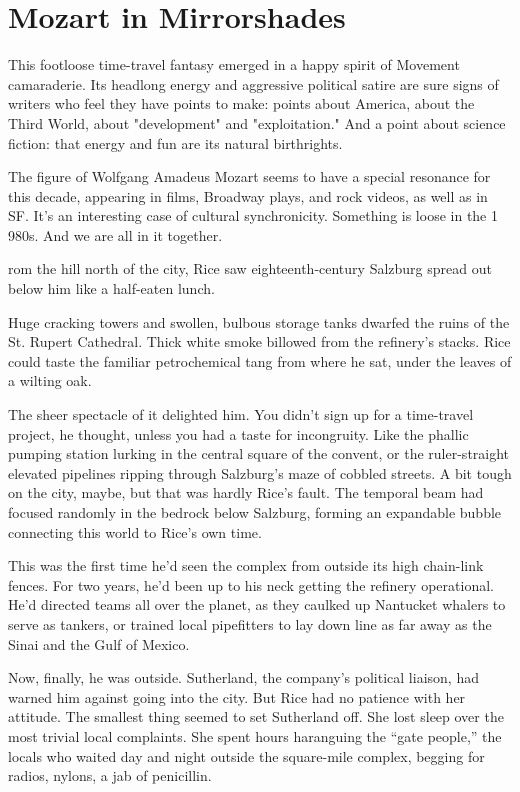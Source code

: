 \chapter{Mozart in Mirrorshades}

This footloose time-travel fantasy emerged in a happy spirit of Movement camaraderie. Its headlong energy and aggressive political satire are sure signs of writers who feel they have points to make: points about America, about the Third World, about "development" and "exploitation." And a point about science fiction: that energy and fun are its natural birthrights.

The figure of Wolfgang Amadeus Mozart seems to have a special resonance for this decade, appearing in films, Broadway plays, and rock videos, as well as in SF. It's an interesting case of cultural synchronicity. Something is loose in the 1 980s. And we are all in it together.

\hrulefill

rom the hill north of the city, Rice saw eighteenth-century Salzburg spread out below him like a half-eaten lunch.

Huge cracking towers and swollen, bulbous storage tanks dwarfed the ruins of the St. Rupert Cathedral. Thick white smoke billowed from the refinery’s stacks. Rice could taste the familiar petrochemical tang from where he sat, under the leaves of a wilting oak.

The sheer spectacle of it delighted him. You didn’t sign up for a time-travel project, he thought, unless you had a taste for incongruity. Like the phallic pumping station lurking in the central square of the convent, or the ruler-straight elevated pipelines ripping through Salzburg’s maze of cobbled streets. A bit tough on the city, maybe, but that was hardly Rice’s fault. The temporal beam had focused randomly in the bedrock below Salzburg, forming an expandable bubble connecting this world to Rice’s own time.

This was the first time he’d seen the complex from outside its high chain-link fences. For two years, he’d been up to his neck getting the refinery operational. He’d directed teams all over the planet, as they caulked up Nantucket whalers to serve as tankers, or trained local pipefitters to lay down line as far away as the Sinai and the Gulf of Mexico.

Now, finally, he was outside. Sutherland, the company’s political liaison, had warned him against going into the city. But Rice had no patience with her attitude. The smallest thing seemed to set Sutherland off. She lost sleep over the most trivial local complaints. She spent hours haranguing the “gate people,” the locals who waited day and night outside the square-mile complex, begging for radios, nylons, a jab of penicillin.

